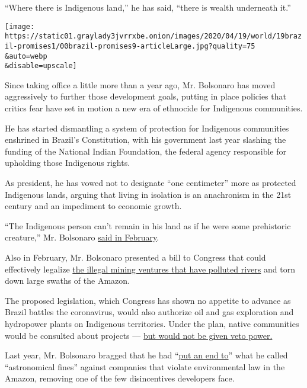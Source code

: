 ``Where there is Indigenous land,'' he has said, ``there is wealth
underneath it.''

\texttt{[image: https://static01.graylady3jvrrxbe.onion/images/2020/04/19/world/19brazil-promises1/00brazil-promises9-articleLarge.jpg?quality=75\\\&auto=webp\\\&disable=upscale]}

Since taking office a little more than a year ago, Mr. Bolsonaro has
moved aggressively to further those development goals, putting in place
policies that critics fear have set in motion a new era of ethnocide for
Indigenous communities.

He has started dismantling a system of protection for Indigenous
communities enshrined in Brazil's Constitution, with his government last
year slashing the funding of the National Indian Foundation, the federal
agency responsible for upholding those Indigenous rights.

As president, he has vowed not to designate ``one centimeter'' more as
protected Indigenous lands, arguing that living in isolation is an
anachronism in the 21st century and an impediment to economic growth.

``The Indigenous person can't remain in his land as if he were some
prehistoric creature,'' Mr. Bolsonaro
\href{https://valor.globo.com/politica/noticia/2020/02/18/indio-nao-pode-ficar-na-sua-terra-como-ser-pre-historico-diz-bolsonaro.ghtml}{said
in February}.

Also in February, Mr. Bolsonaro presented a bill to Congress that could
effectively legalize
\href{https://www.nytimes3xbfgragh.onion/2018/11/10/world/americas/brazil-indigenous-mining-bolsonaro.html}{the
illegal mining ventures that have polluted rivers} and torn down large
swaths of the Amazon.

The proposed legislation, which Congress has shown no appetite to
advance as Brazil battles the coronavirus, would also authorize oil and
gas exploration and hydropower plants on Indigenous territories. Under
the plan, native communities would be consulted about projects ---
\href{https://agenciabrasil.ebc.com.br/politica/noticia/2020-02/bolsonaro-envia-projeto-que-regulamenta-exploracao-de-terras-indigenas}{but
would not be given veto power.}

Last year, Mr. Bolsonaro bragged that he had
``\href{https://www.nytimes3xbfgragh.onion/2019/08/27/world/americas/bolsonaro-brazil-environment.html}{put
an end to}'' what he called ``astronomical fines'' against companies
that violate environmental law in the Amazon, removing one of the few
disincentives developers face.

